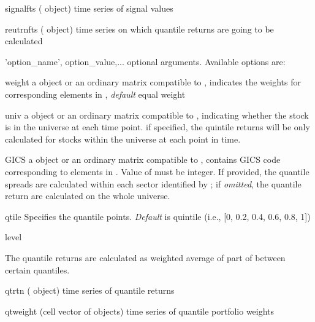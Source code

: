 \inarg
   \begin{argdesc}
	   \item[signalfts] (\myfints{} object) time series of signal values
	   \item[reutrnfts] (\myfints{} object) time series on which quantile returns are going to be calculated
	   \item['option\_name', option\_value,...] optional arguments.
                     Available options are:
		\begin{argdesc}
			  \item[weight] a \myfints{} object or an ordinary matrix compatible to ,
			               indicates the weights for corresponding elements in ,
			              \emph{default} equal weight
		    \item[univ] a \myfints{} object or an ordinary matrix compatible to , 
                     indicating
		               whether the stock is in the universe at each time point.
		               if specified, the quintile returns will be
		               only calculated for stocks within the universe at each point in time. 
			  \item[GICS] a \myfints{} object or an ordinary matrix compatible to ,
			             contains GICS code corresponding to elements in .
                      Value of  must be integer.
                      If provided, the quantile spreads are calculated within each sector identified by ;
			             if \emph{omitted}, the quantile return are calculated on the whole universe.
		    \item [qtile] Specifies the quantile points. \emph{Default} is quintile (i.e., [0, 0.2, 0.4, 0.6, 0.8, 1])
		    \item [level] 
	   \end{argdesc}	

	   The quantile returns are calculated as weighted average of part of
	    between certain quantiles.
	\end{argdesc}

\outarg
   \begin{argdesc}	
	   \item[qtrtn] (\myfints{} object)  time series of quantile returns
	   \item[qtweight] (cell vector of \myfints{} objects) time series of quantile portfolio weights
   \end{argdesc}



